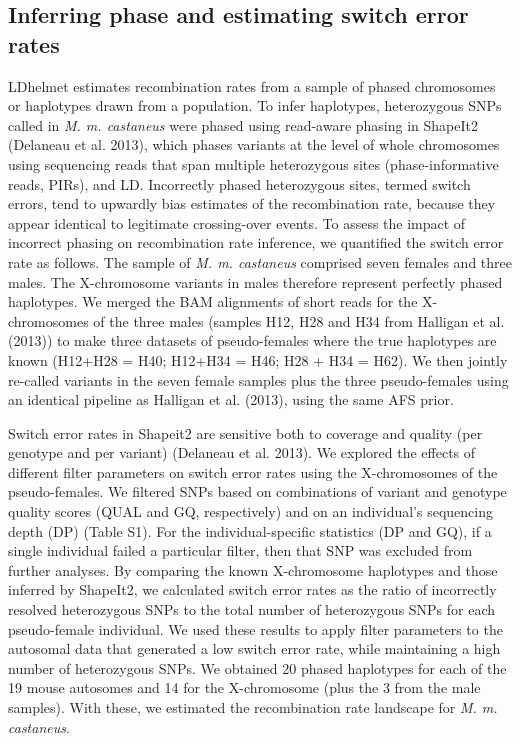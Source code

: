 \subsection{Inferring phase and estimating switch error rates}
 
LDhelmet estimates recombination rates from a sample of phased chromosomes or haplotypes drawn from a population. To infer haplotypes, heterozygous SNPs called in \textit{M. m. castaneus} were phased using read-aware phasing in ShapeIt2 (Delaneau et al. 2013), which phases variants at the level of whole chromosomes using sequencing reads that span multiple heterozygous sites (phase-informative reads, PIRs), and LD. Incorrectly phased heterozygous sites, termed switch errors, tend to upwardly bias estimates of the recombination rate, because they appear identical to legitimate crossing-over events. To assess the impact of incorrect phasing on recombination rate inference, we quantified the switch error rate as follows. The sample of \textit{M. m. castaneus} comprised seven females and three males. The X-chromosome variants in males therefore represent perfectly phased haplotypes. We merged the BAM alignments of short reads for the X-chromosomes of the three males (samples H12, H28 and H34 from Halligan et al. (2013)) to make three datasets of pseudo-females where the true haplotypes are known (H12+H28 = H40; H12+H34 = H46; H28 + H34 = H62). We then jointly re-called variants in the seven female samples plus the three pseudo-females using an identical pipeline as Halligan et al. (2013), using the same AFS prior.
 
Switch error rates in Shapeit2 are sensitive both to coverage and quality (per genotype and per variant) (Delaneau et al. 2013). We explored the effects of different filter parameters on switch error rates using the X-chromosomes of the pseudo-females. We filtered SNPs based on combinations of variant and genotype quality scores (QUAL and GQ, respectively) and on an individual’s sequencing depth (DP) (Table S1). For the individual-specific statistics (DP and GQ), if a single individual failed a particular filter, then that SNP was excluded from further analyses. By comparing the known X-chromosome haplotypes and those inferred by ShapeIt2, we calculated switch error rates as the ratio of incorrectly resolved heterozygous SNPs to the total number of heterozygous SNPs for each pseudo-female individual. We used these results to apply filter parameters to the autosomal data that generated a low switch error rate, while maintaining a high number of heterozygous SNPs. We obtained 20 phased haplotypes for each of the 19 mouse autosomes and 14 for the X-chromosome (plus the 3 from the male samples). With these, we estimated the recombination rate landscape for \textit{M. m. castaneus}.
 

